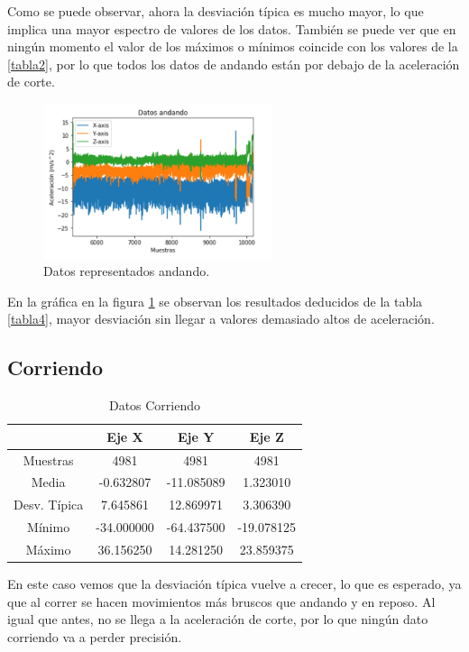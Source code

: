 \documentclass[12pt]{book}
\numberwithin{equation}{section}
\begin{document}
Como se puede observar, ahora la desviación típica es mucho mayor, lo que implica una mayor espectro de valores de los datos. También se puede ver que en ningún momento el valor de los máximos o mínimos coincide con los valores de la \ref{tabla2}, por lo que todos los datos de andando están por debajo de la aceleración de corte.

\begin{figure}[h]
    \centering
    \includegraphics[width=0.6\textwidth]{andandodatos.png}
    \caption{Datos representados andando.}
    \label{fig:andandodatos}
\end{figure}

En la gráfica en la figura \ref{tabla5} se observan los resultados deducidos de la tabla \ref{tabla4}, mayor desviación sin llegar a valores demasiado altos de aceleración.

\newpage
\subsection{Corriendo}

\begin{table}[h]
\centering
\caption{Datos Corriendo}
\begin{tabular}{| c | c | c | c |}
\hline
 & Eje X & Eje Y & Eje Z \\
\hline
Muestras & 4981 & 4981 & 4981 \\
\hline
Media & -0.632807 & -11.085089 & 1.323010 \\
\hline
Desv. Típica & 7.645861 & 12.869971 & 3.306390 \\
\hline
Mínimo & -34.000000 & -64.437500 & -19.078125 \\
\hline
Máximo & 36.156250 & 14.281250 & 23.859375 \\
\hline
\end{tabular}
\label{tabla5}
\end{table}

En este caso vemos que la desviación típica vuelve a crecer, lo que es esperado, ya que al correr se hacen movimientos más bruscos que andando y en reposo. Al igual que antes, no se llega a la aceleración de corte, por lo que ningún dato corriendo va a perder precisión.
\end{document}
